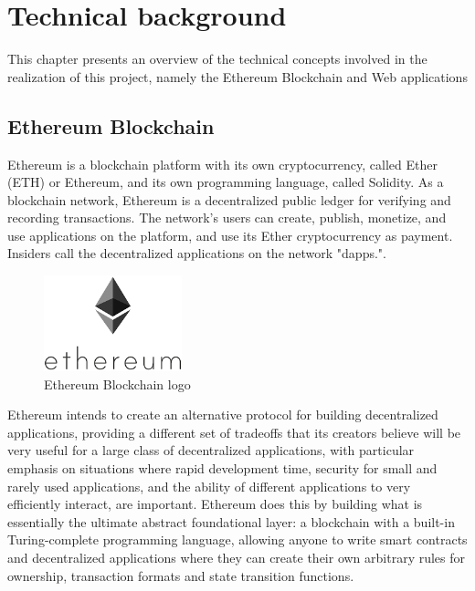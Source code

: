 \chapter{Technical background}
This chapter presents an overview of the technical concepts involved in the realization of this project, namely the Ethereum Blockchain and Web applications

\section{Ethereum Blockchain}
Ethereum is a blockchain platform with its own \gls{cryptocurrency}, called Ether (ETH) or Ethereum, and its own programming language, called Solidity. As a blockchain network, Ethereum is a decentralized public ledger for verifying and recording transactions. The network's users can create, publish, monetize, and use applications on the platform, and use its Ether cryptocurrency as payment. Insiders call the decentralized applications on the network "dapps."\cite{ethereumcommunityEthereumDevelopmentDocumentation}.

\begin{figure}
	\vspace{-10pt}
	\includegraphics[width=4cm]{images/chapter2/ethereum.png}
	\vspace{-10pt}
	\caption{{\footnotesize Ethereum Blockchain logo}}
\end{figure}

Ethereum intends to create an alternative protocol for building decentralized applications, providing a different set of tradeoffs that its creators believe will be very useful for a large class of decentralized applications, with particular emphasis on situations where rapid development time, security for small and rarely used applications, and the ability of different applications to very efficiently interact, are important. Ethereum does this by building what is essentially the ultimate abstract foundational layer: a blockchain with a built-in Turing-complete programming language, allowing anyone to write smart contracts and decentralized applications where they can create their own arbitrary rules for ownership, transaction formats and state transition functions.\cite{buterinvitalikEthereumWhitePaper2013}

